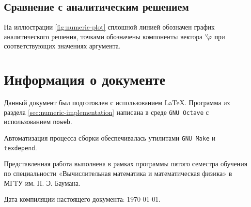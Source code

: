 \documentclass{article}
\numberwithin{equation}{section}
\renewcommand{\phi}{\varphi}
\renewcommand{\vec}[1]{{}^{\vee}\negmedspace#1}
\providecommand{\program}[1]{{\tt #1}}
\begin{document}



\subsection{Сравнение с аналитическим решением}
\label{sec:comparison}

На иллюстрации \ref{fig:numeric-plot} сплошной линией обозначен график
аналитического решения, точками обозначены компоненты вектора
$\vec{\phi}$ при соответствующих значениях аргумента.



\clearpage
\appendix
\section{Информация о документе}

Данный документ был подготовлен с использованием \LaTeX{}. Программа
из раздела \ref{sec:numeric-implementation} написана в среде
\program{GNU Octave} с использованием \program{noweb}.

Автоматизация процесса сборки обеспечивалась утилитами
\program{GNU Make} и \program{texdepend}.

Представленная работа выполнена в рамках программы пятого семестра
обучения по специальности «Вычислительная математика и математическая
физика» в МГТУ им. Н. Э. Баумана.

Дата компиляции настоящего документа: \today.



\end{document}
